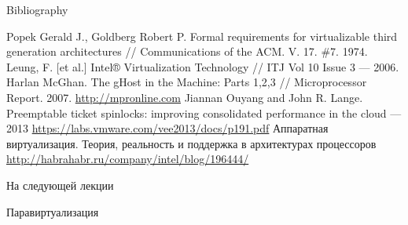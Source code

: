 \begin{frame}[allowframebreaks]{Bibliography}
\begin{thebibliography}{99}
 Popek Gerald J., Goldberg Robert P. Formal requirements for virtualizable third generation architectures // Communications of the ACM. V. 17. \#7. 1974.
 Leung, F. [et al.] Intel® Virtualization Technology // ITJ Vol 10 Issue 3 — 2006.
 Harlan McGhan. The gHost in the Machine: Parts 1,2,3 // Microprocessor Report. 2007. \url{http://mpronline.com}
 Jiannan Ouyang and John R. Lange. Preemptable ticket spinlocks: improving consolidated performance in the cloud — 2013 \url{https://labs.vmware.com/vee2013/docs/p191.pdf}
 Аппаратная виртуализация. Теория, реальность и поддержка в архитектурах процессоров \url{http://habrahabr.ru/company/intel/blog/196444/}
\end{thebibliography}
\end{frame}

\begin{frame}{На следующей лекции}
\centering

Паравиртуализация

\end{frame}

\finalslide


